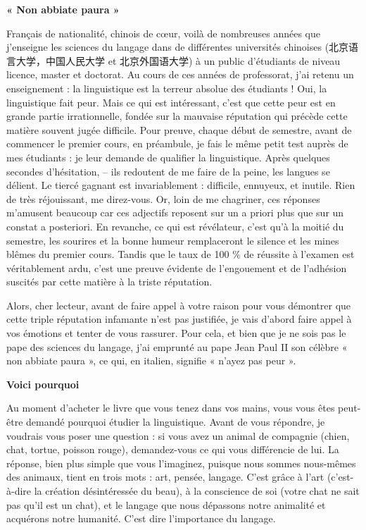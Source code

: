 \begingroup\itshape
\begin{center}\bfseries « Non abbiate paura »\end{center}
Français de nationalité, chinois de cœur, voilà de nombreuses années que j’enseigne les sciences du langage dans de différentes universités chinoises (北京语言大学，中国人民大学 et 北京外国语大学) à un public d’étudiants de niveau licence, master et doctorat. Au cours de ces années de professorat, j’ai retenu un enseignement : la linguistique est la terreur absolue des étudiants ! Oui, la linguistique fait peur. Mais ce qui est intéressant, c’est que cette peur est en grande partie irrationnelle, fondée sur la mauvaise réputation qui précède cette matière souvent jugée difficile. Pour preuve, chaque début de semestre, avant de commencer le premier cours, en préambule, je fais le même petit test auprès de mes étudiants : je leur demande de qualifier la linguistique. Après quelques secondes d’hésitation, -- ils redoutent de me faire de la peine, les langues se délient. Le tiercé gagnant est invariablement : difficile, ennuyeux, et inutile. Rien de très réjouissant, me direz-vous. Or, loin de me chagriner, ces réponses m’amusent beaucoup car ces adjectifs reposent sur un a priori plus que sur un constat a posteriori. En revanche, ce qui est révélateur, c’est qu’à la moitié du semestre, les sourires et la bonne humeur remplaceront le silence et les mines blêmes du premier cours. Tandis que le taux de 100 \% de réussite à l’examen est véritablement ardu, c’est une preuve évidente de l’engouement et de l’adhésion suscités par cette matière à la triste réputation.

Alors, cher lecteur, avant de faire appel à votre raison pour vous démontrer que cette triple réputation infamante n’est pas justifiée, je vais d’abord faire appel à vos émotions et tenter de vous rassurer. Pour cela, et bien que je ne sois pas le pape des sciences du langage, j’ai emprunté au pape Jean Paul II son célèbre « non abbiate paura », ce qui, en italien, signifie « n’ayez pas peur ».

\begin{center}\bfseries Voici pourquoi\end{center}
Au moment d’acheter le livre que vous tenez dans vos mains, vous vous êtes peut-être demandé pourquoi étudier la linguistique. Avant de vous répondre, je voudrais vous poser une question : si vous avez un animal de compagnie (chien, chat, tortue, poisson rouge), demandez-vous ce qui vous différencie de lui. La réponse, bien plus simple que vous l’imaginez, puisque nous sommes nous-mêmes des animaux, tient en trois mots : art, pensée, langage. C’est grâce à l’art (c’est-à-dire la création désintéressée du beau), à la conscience de soi (votre chat ne sait pas qu’il est un chat), et le langage que nous dépassons notre animalité et acquérons notre humanité. C’est dire l’importance du langage.

